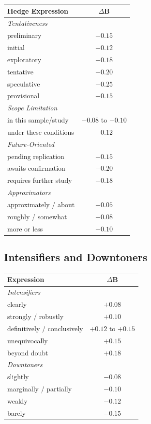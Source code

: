 \documentclass[11pt,a4paper]{article}
\begin{document}
\begin{center}
\begin{tabular}{lc}
\toprule
\textbf{Hedge Expression} & \textbf{$\Delta$B} \\
\midrule
\textit{Tentativeness} & \\
preliminary & $-0.15$ \\
initial & $-0.12$ \\
exploratory & $-0.18$ \\
tentative & $-0.20$ \\
speculative & $-0.25$ \\
provisional & $-0.15$ \\
\midrule
\textit{Scope Limitation} & \\
in this sample/study & $-0.08$ to $-0.10$ \\
under these conditions & $-0.12$ \\
\midrule
\textit{Future-Oriented} & \\
pending replication & $-0.15$ \\
awaits confirmation & $-0.20$ \\
requires further study & $-0.18$ \\
\midrule
\textit{Approximators} & \\
approximately / about & $-0.05$ \\
roughly / somewhat & $-0.08$ \\
more or less & $-0.10$ \\
\bottomrule
\end{tabular}
\end{center}

\subsection{Intensifiers and Downtoners}

\begin{center}
\begin{tabular}{lc}
\toprule
\textbf{Expression} & \textbf{$\Delta$B} \\
\midrule
\textit{Intensifiers} & \\
clearly & $+0.08$ \\
strongly / robustly & $+0.10$ \\
definitively / conclusively & $+0.12$ to $+0.15$ \\
unequivocally & $+0.15$ \\
beyond doubt & $+0.18$ \\
\midrule
\textit{Downtoners} & \\
slightly & $-0.08$ \\
marginally / partially & $-0.10$ \\
weakly & $-0.12$ \\
barely & $-0.15$ \\
\bottomrule
\end{tabular}
\end{center}
\end{document}
